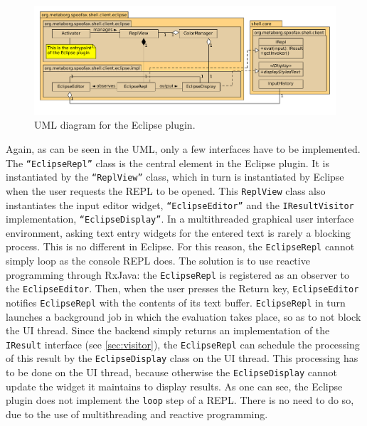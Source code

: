 \begin{figure}[h]
  \includegraphics[width=\textwidth]{uml-eclipse}
  \caption{UML diagram for the Eclipse plugin.}
  \label{fig:uml-eclipse}
\end{figure}

Again, as can be seen in the UML, only a few interfaces have to be implemented.
The \texttt{``EclipseRepl''} class is the central element in the Eclipse plugin.
It is instantiated by the \texttt{``ReplView''} class, which in turn is
instantiated by Eclipse when the user requests the REPL to be opened. This
\texttt{ReplView} class also instantiates the input editor widget,
\texttt{``EclipseEditor''} and the \texttt{IResultVisitor} implementation,
\texttt{``EclipseDisplay''}.
In a multithreaded graphical user interface environment, asking text entry
widgets for the entered text is rarely a blocking process. This is no different
in Eclipse. For this reason, the \texttt{EclipseRepl} cannot simply loop as the
console REPL does. The solution is to use reactive programming through RxJava:
the \texttt{EclipseRepl} is registered as an observer to the
\texttt{EclipseEditor}. Then, when the user presses the Return key,
\texttt{EclipseEditor} notifies \texttt{EclipseRepl} with the contents of its
text buffer. \texttt{EclipseRepl} in turn launches a background job in which the
evaluation takes place, so as to not block the UI thread. Since the backend
simply returns an implementation of the \texttt{IResult} interface (see
\cref{sec:visitor}), the \texttt{EclipseRepl} can schedule the processing of this
result by the \texttt{EclipseDisplay} class on the UI thread. This processing
has to be done on the UI thread, because otherwise the \texttt{EclipseDisplay}
cannot update the widget it maintains to display results.
As one can see, the Eclipse plugin does not implement the \texttt{loop} step of
a REPL. There is no need to do so, due to the use of multithreading and reactive
programming.

